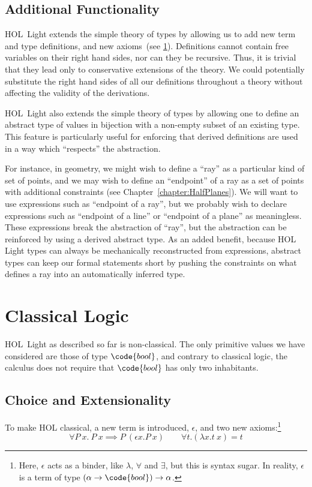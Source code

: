 \subsection{Additional Functionality}
HOL~Light extends the simple theory of types by allowing us to add new term and type definitions, and new axioms~(see \ref{sec:ClassicalAxioms}). Definitions cannot contain free variables on their right hand sides, nor can they be recursive. Thus, it is trivial that they lead only to conservative extensions of the theory. We could potentially substitute the right hand sides of all our definitions throughout a theory without affecting the validity of the derivations.

HOL~Light also extends the simple theory of types by allowing one to define an abstract type of values in bijection with a non-empty subset of an existing type. This feature is particularly useful for enforcing that derived definitions are used in a way which ``respects'' the abstraction.

For instance, in geometry, we might wish to define a ``ray'' as a particular kind of set of points, and we may wish to define an ``endpoint'' of a ray as a set of points with additional constraints (see Chapter~\ref{chapter:HalfPlanes}). We will want to use expressions such as ``endpoint of a ray'', but we probably wish to declare expressions such as ``endpoint of a line'' or ``endpoint of a plane'' as meaningless. These expressions break the abstraction of ``ray'', but the abstraction can be reinforced by using a derived abstract type. As an added benefit, because HOL Light types can always be mechanically reconstructed from expressions, abstract types can keep our formal statements short by pushing the constraints on what defines a ray into an automatically inferred type.

\section{Classical Logic}\label{sec:ClassicalAxioms}
HOL~Light as described so far is non-classical. The only primitive values we have considered are those of type $\code{bool}$, and contrary to classical logic, the calculus does not require that $\code{bool}$ has only two inhabitants.

\subsection{Choice and Extensionality}
To make HOL classical, a new term is introduced, $\epsilon$, and two new axioms:\footnote{Here, $\epsilon$ acts as a binder, like $\lambda$, $\forall$ and $\exists$, but this is syntax sugar. In reality, $\epsilon$ is a term of type $(\alpha \rightarrow \code{bool}) \rightarrow \alpha$.}
\begin{displaymath}
\forall P\ x.\ P\ x \implies P\ (\epsilon x. P\ x) \qquad \forall t. (\lambda x. t\ x) = t
\end{displaymath}

